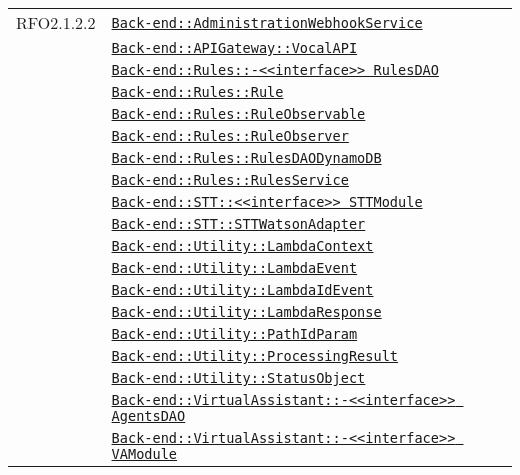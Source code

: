\begin{longtable}{|>{\centering}m{3cm}|m{10cm}<{\centering}|}
RFO2.1.2.2 & \hyperref[Back-end::AdministrationWebhookService]{\texttt{Back-end::AdministrationWebhookService}}\\
& \hyperref[Back-end::APIGateway::VocalAPI]{\texttt{Back-end::APIGateway::VocalAPI}}\\
& \hyperref[Back-end::Rules::<<interface>> RulesDAO]{\texttt{Back-end::Rules::-\linebreak <<interface>> RulesDAO}}\\
& \hyperref[Back-end::Rules::Rule]{\texttt{Back-end::Rules::Rule}}\\
& \hyperref[Back-end::Rules::RuleObservable]{\texttt{Back-end::Rules::RuleObservable}}\\
& \hyperref[Back-end::Rules::RuleObserver]{\texttt{Back-end::Rules::RuleObserver}}\\
& \hyperref[Back-end::Rules::RulesDAODynamoDB]{\texttt{Back-end::Rules::RulesDAODynamoDB}}\\
& \hyperref[Back-end::Rules::RulesService]{\texttt{Back-end::Rules::RulesService}}\\
& \hyperref[Back-end::STT::<<interface>> STTModule]{\texttt{Back-end::STT::<<interface>> STTModule}}\\
& \hyperref[Back-end::STT::STTWatsonAdapter]{\texttt{Back-end::STT::STTWatsonAdapter}}\\
& \hyperref[Back-end::Utility::LambdaContext]{\texttt{Back-end::Utility::LambdaContext}}\\
& \hyperref[Back-end::Utility::LambdaEvent]{\texttt{Back-end::Utility::LambdaEvent}}\\
& \hyperref[Back-end::Utility::LambdaIdEvent]{\texttt{Back-end::Utility::LambdaIdEvent}}\\
& \hyperref[Back-end::Utility::LambdaResponse]{\texttt{Back-end::Utility::LambdaResponse}}\\
& \hyperref[Back-end::Utility::PathIdParam]{\texttt{Back-end::Utility::PathIdParam}}\\
& \hyperref[Back-end::Utility::ProcessingResult]{\texttt{Back-end::Utility::ProcessingResult}}\\
& \hyperref[Back-end::Utility::StatusObject]{\texttt{Back-end::Utility::StatusObject}}\\
& \hyperref[Back-end::VirtualAssistant::<<interface>> AgentsDAO]{\texttt{Back-end::VirtualAssistant::-\linebreak <<interface>> AgentsDAO}}\\
& \hyperref[Back-end::VirtualAssistant::<<interface>> VAModule]{\texttt{Back-end::VirtualAssistant::-\linebreak <<interface>> VAModule}}\\

\end{longtable}

